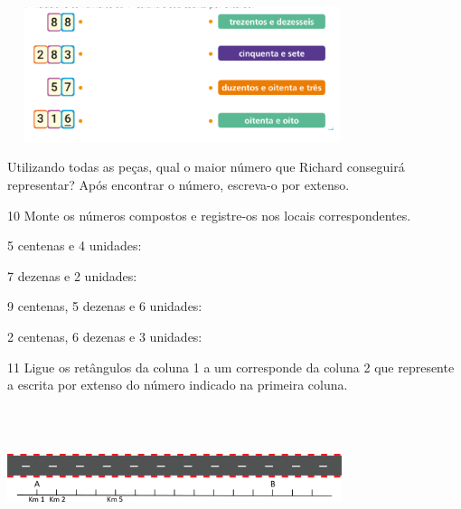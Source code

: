 
\includegraphics[width=4.02535in,height=1.55013in]{media/image5.png}

Utilizando todas as peças, qual o maior número que Richard conseguirá
representar? Após encontrar o número, escreva-o por extenso.


\num{10} Monte os números compostos e registre-os nos locais correspondentes.

\begin{escolha}
\item 5 centenas e 4 unidades:

\reduline{504\hfill}

\item 7 dezenas e 2 unidades:

\reduline{72\hfill}

\item 9 centenas, 5 dezenas e 6 unidades:

\reduline{956\hfill}

\item 2 centenas, 6 dezenas e 3 unidades:

\reduline{263\hfill}

\end{escolha}

\num{11} Ligue os retângulos da coluna 1 a um corresponde da coluna 2 que
represente a escrita por extenso do número indicado na primeira coluna.

\includegraphics[width=3.85033in,height=1.64181in]{media/image6.png}


